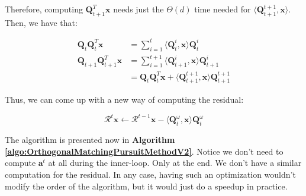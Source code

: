\documentclass[12pt,a4paper,oneside,english]{UPBThesis}
\begin{document}
Therefore, computing $\textbf{Q}_{t+1}^T\textbf{x}$ needs just the $\Theta(d)$ time needed for $\langle \textbf{Q}_{t+1}^{t+1}, \textbf{x} \rangle$. Then, we have that:

\begin{align*}
\textbf{Q}_t\textbf{Q}_t^T\textbf{x} & = \sum_{i=1}^t {\langle \textbf{Q}_t^i, \textbf{x} \rangle \textbf{Q}_t^i} \\
\textbf{Q}_{t+1}\textbf{Q}_{t+1}^T\textbf{x} & = \sum_{i=1}^{t+1} {\langle \textbf{Q}_{t+1}^i, \textbf{x} \rangle \textbf{Q}_{t+1}^i} \\
& = \textbf{Q}_t\textbf{Q}_t^T\textbf{x} + \langle \textbf{Q}_{t+1}^{t+1}, \textbf{x} \rangle \textbf{Q}_{t+1}^{t+1}
\end{align*}

Thus, we can come up with a new way of computing the residual:

\begin{equation*}
\mathcal{R}^t\textbf{x} \gets \mathcal{R}^{t-1}\textbf{x} - \langle \textbf{Q}_{t}^{\omega}, \textbf{x} \rangle \textbf{Q}_{t}^{\omega}
\end{equation*}

The algorithm is presented now in \textbf{Algorithm \ref{algo:OrthogonalMatchingPursuitMethodV2}}. Notice we don't need to compute $\textbf{a}^t$ at all during the inner-loop. Only at the end. We don't have a similar computation for the residual. In any case, having such an optimization wouldn't modify the order of the algorithm, but it would just do a speedup in practice.
\end{document}
